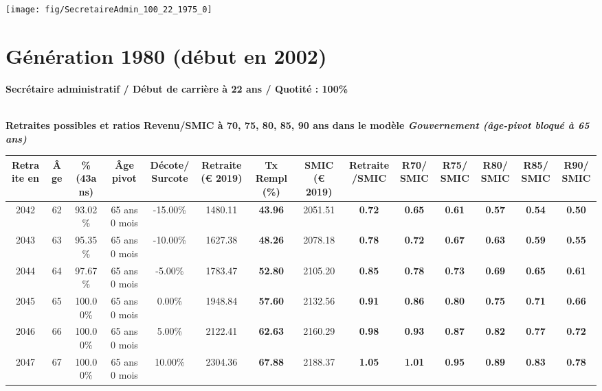  {\hspace{-2.2cm}\texttt{[image: fig/SecretaireAdmin\_100\_22\_1975\_0]}} 

\newpage 
 
\section{Génération 1980 (début en 2002)\label{SecretaireAdmin_100_22_1980_0}} 
 
{\bf \noindent Secrétaire administratif / Début de carrière à 22 ans / Quotité : 100\%}  ~ 

 ~\\{\bf \noindent Retraites possibles et ratios Revenu/SMIC à 70, 75, 80, 85, 90 ans dans le modèle \emph{Gouvernement (âge-pivot bloqué à 65 ans)}}  
 
\begin{adjustbox}{max width=\textwidth} 
\begin{tabular}[htb]{|c|c||c|c|c||c|c||c|c||c|c|c|c|c|} 
\hline 
 Retraite en &  Âge &  \%(43ans) &  Âge pivot &  Décote/Surcote &  Retraite (\euro{} 2019) &  Tx Rempl(\%) &  SMIC (\euro{} 2019) &  Retraite/SMIC &  R70/SMIC &  R75/SMIC &  R80/SMIC &  R85/SMIC &  R90/SMIC \\ 
\hline \hline 
 2042 &  62 &  93.02\% &  65 ans 0 mois &  -15.00\% &  1480.11 &  {\bf 43.96} &  2051.51 &  {\bf {\color{red} 0.72}} &  {\bf {\color{red} 0.65}} &  {\bf {\color{red} 0.61}} &  {\bf {\color{red} 0.57}} &  {\bf {\color{red} 0.54}} &  {\bf {\color{red} 0.50}} \\ 
\hline 
 2043 &  63 &  95.35\% &  65 ans 0 mois &  -10.00\% &  1627.38 &  {\bf 48.26} &  2078.18 &  {\bf {\color{red} 0.78}} &  {\bf {\color{red} 0.72}} &  {\bf {\color{red} 0.67}} &  {\bf {\color{red} 0.63}} &  {\bf {\color{red} 0.59}} &  {\bf {\color{red} 0.55}} \\ 
\hline 
 2044 &  64 &  97.67\% &  65 ans 0 mois &  -5.00\% &  1783.47 &  {\bf 52.80} &  2105.20 &  {\bf {\color{red} 0.85}} &  {\bf {\color{red} 0.78}} &  {\bf {\color{red} 0.73}} &  {\bf {\color{red} 0.69}} &  {\bf {\color{red} 0.65}} &  {\bf {\color{red} 0.61}} \\ 
\hline 
 2045 &  65 &  100.00\% &  65 ans 0 mois &  0.00\% &  1948.84 &  {\bf 57.60} &  2132.56 &  {\bf {\color{red} 0.91}} &  {\bf {\color{red} 0.86}} &  {\bf {\color{red} 0.80}} &  {\bf {\color{red} 0.75}} &  {\bf {\color{red} 0.71}} &  {\bf {\color{red} 0.66}} \\ 
\hline 
 2046 &  66 &  100.00\% &  65 ans 0 mois &  5.00\% &  2122.41 &  {\bf 62.63} &  2160.29 &  {\bf {\color{red} 0.98}} &  {\bf {\color{red} 0.93}} &  {\bf {\color{red} 0.87}} &  {\bf {\color{red} 0.82}} &  {\bf {\color{red} 0.77}} &  {\bf {\color{red} 0.72}} \\ 
\hline 
 2047 &  67 &  100.00\% &  65 ans 0 mois &  10.00\% &  2304.36 &  {\bf 67.88} &  2188.37 &  {\bf 1.05} &  {\bf 1.01} &  {\bf {\color{red} 0.95}} &  {\bf {\color{red} 0.89}} &  {\bf {\color{red} 0.83}} &  {\bf {\color{red} 0.78}} \\ 
\hline 
\hline 
\end{tabular} 
\end{adjustbox} 
 
